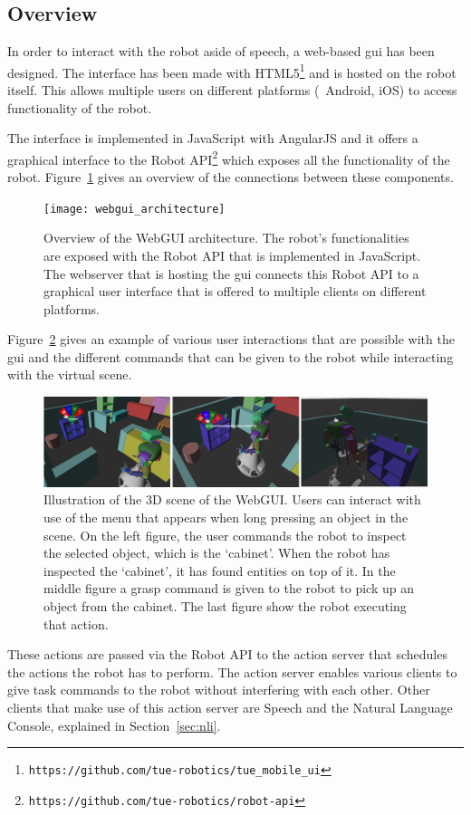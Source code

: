 \subsection*{Overview}

In order to interact with the robot aside of speech, a web-based \gls{gui} has been designed.
The interface has been made with HTML5\footnote{\texttt{https://github.com/tue-robotics/tue\_mobile\_ui}} and is hosted on the robot itself.
This allows multiple users on different platforms (\eg\ Android, iOS) to access functionality of the robot.

The interface is implemented in JavaScript with AngularJS and it offers a graphical interface to the Robot API\footnote{\texttt{https://github.com/tue-robotics/robot-api}} which exposes all the functionality of the robot.
Figure~\ref{fig:webgui_architecture} gives an overview of the connections between these components.

\begin{figure}[H]
	\texttt{[image: webgui\_architecture]}
	\caption{
		Overview of the WebGUI architecture.
		The robot's functionalities are exposed with the Robot API that is implemented in JavaScript.
		The webserver that is hosting the \gls{gui} connects this Robot API to a graphical user interface that is offered to multiple clients on different platforms.}
	\label{fig:webgui_architecture}
\end{figure}

Figure~\ref{fig:gui_actions} gives an example of various user interactions that are possible with the \gls{gui} and the different commands that can be given to the robot while interacting with the virtual scene.

\begin{figure}[H]
	\includegraphics[width=\linewidth]{Figures/gui_actions}
	\caption{
		Illustration of the 3D scene of the WebGUI.
		Users can interact with use of the menu that appears when long pressing an object in the scene.
		On the left figure, the user commands the robot to inspect the selected object, which is the `cabinet'.
		When the robot has inspected the `cabinet', it has found entities on top of it.
		In the middle figure a grasp command is given to the robot to pick up an object from the cabinet.
		The last figure show the robot executing that action.}
	\label{fig:gui_actions}
\end{figure}

These actions are passed via the Robot API to the action server that schedules the actions the robot has to perform.
The action server enables various clients to give task commands to the robot without interfering with each other.
Other clients that make use of this action server are Speech and the Natural Language Console, explained in Section~\ref{sec:nli}.
